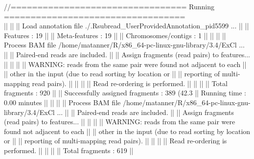 \documentclass[12pt]{article}
\begin{document}
\begin{scriptsize}
\begin{Schunk}
\begin{Soutput}
//================================= Running ==================================\\
||                                                                            ||
|| Load annotation file ./.Rsubread_UserProvidedAnnotation_pid5599 ...        ||
||    Features : 19                                                           ||
||    Meta-features : 19                                                      ||
||    Chromosomes/contigs : 1                                                 ||
||                                                                            ||
|| Process BAM file /home/matanner/R/x86_64-pc-linux-gnu-library/3.4/ExCl ... ||
||    Paired-end reads are included.                                          ||
||    Assign fragments (read pairs) to features...                            ||
||                                                                            ||
||    WARNING: reads from the same pair were found not adjacent to each       ||
||             other in the input (due to read sorting by location or         ||
||             reporting of multi-mapping read pairs).                        ||
||                                                                            ||
||    Read re-ordering is performed.                                          ||
||                                                                            ||
||    Total fragments : 920                                                   ||
||    Successfully assigned fragments : 389 (42.3%)                           ||
||    Running time : 0.00 minutes                                             ||
||                                                                            ||
|| Process BAM file /home/matanner/R/x86_64-pc-linux-gnu-library/3.4/ExCl ... ||
||    Paired-end reads are included.                                          ||
||    Assign fragments (read pairs) to features...                            ||
||                                                                            ||
||    WARNING: reads from the same pair were found not adjacent to each       ||
||             other in the input (due to read sorting by location or         ||
||             reporting of multi-mapping read pairs).                        ||
||                                                                            ||
||    Read re-ordering is performed.                                          ||
||                                                                            ||
||    Total fragments : 619                                                   ||

\end{Soutput}
\end{Schunk}
\end{scriptsize}
\end{document}
